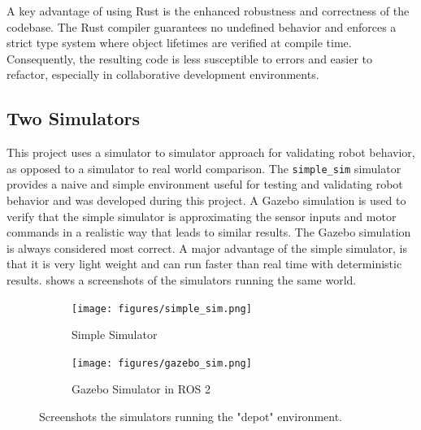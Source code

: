 A key advantage of using Rust is the enhanced robustness and correctness of the codebase. The Rust compiler guarantees no undefined behavior and enforces a strict type system where object lifetimes are verified at compile time. Consequently, the resulting code is less susceptible to errors and easier to refactor, especially in collaborative development environments.

\subsection{Two Simulators}
This project uses a simulator to simulator approach for validating robot behavior, as opposed to a simulator to real world comparison. The \texttt{simple\_sim} simulator provides a naive and simple environment useful for testing and validating robot behavior and was developed during this project. A Gazebo simulation is used to verify that the simple simulator is approximating the sensor inputs and motor commands in a realistic way that leads to similar results. The Gazebo simulation is always considered most correct. A major advantage of the simple simulator, is that it is very light weight and can run faster than real time with deterministic results. 
 shows a screenshots of the simulators running the same world.

\begin{figure}[h]
    \centering
    \begin{subfigure}[b]{0.45\textwidth}
        \centering
        \texttt{[image: figures/simple\_sim.png]}
        \caption{Simple Simulator}
    \end{subfigure}
    \hfill
    \begin{subfigure}[b]{0.45\textwidth}
        \centering
        \texttt{[image: figures/gazebo\_sim.png]}
        \caption{Gazebo Simulator in ROS 2}
    \end{subfigure}
    \caption{Screenshots the simulators running the "depot" environment.}
      \label{fig:simulators}
\end{figure}
